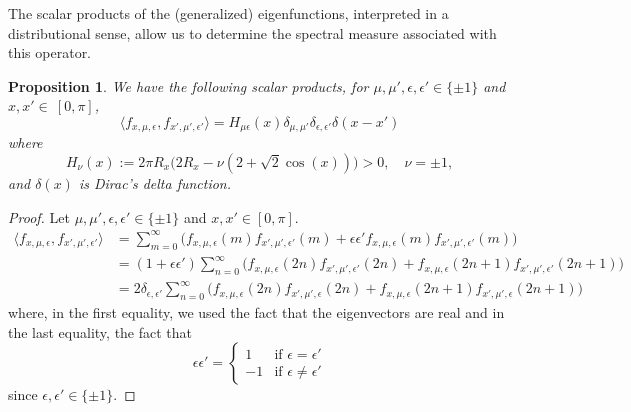 \documentclass[11pt]{amsart}
\theoremstyle{definition}
\theoremstyle{remark}
\theoremstyle{plain}
\newtheorem{proposition}{Proposition}
\numberwithin{equation}{section}
\numberwithin{lemma}{section}
\numberwithin{definition}{section}
\numberwithin{proposition}{section}
\numberwithin{corollary}{section}
\numberwithin{theorem}{section}
\numberwithin{remark}{section}
\begin{document}
The scalar products of the (generalized) eigenfunctions, interpreted in a distributional sense, allow us to determine the spectral measure associated with this operator.
\begin{proposition}\label{scalar_products1}
We have the following scalar products, for $\mu,\mu',\epsilon, \epsilon' \in \{\pm 1\}$ and $x,x'\in~[0,\pi]$,
 $$
 \langle f_{x,\mu,\epsilon},  f_{x',\mu',\epsilon'} \rangle=H_{\mu\epsilon}(x)\delta_{\mu,\mu'}\delta_{\epsilon,\epsilon'}\delta(x-x')
$$
where 
\begin{equation}\label{H_eps}
 H_{\nu}(x):=2\pi R_x\big(2R_x-\nu(2+\sqrt{2}\cos(x))\big)>0, \quad \nu=\pm1,
\end{equation}
and $\delta(x)$ is Dirac's delta function.
\end{proposition}
\begin{proof}
 
Let $\mu,\mu',\epsilon, \epsilon' \in \{\pm 1\}$ and $x,x' \in [0,\pi]$.
\begin{align*}
 \langle f_{x,\mu,\epsilon}, f_{x',\mu',\epsilon'} \rangle 
& = \sum_{m=0}^\infty \Big( f_{x,\mu,\epsilon}(m) f_{x',\mu',\epsilon'}(m) + \epsilon\epsilon' f_{x,\mu,\epsilon}(m) f_{x',\mu',\epsilon'}(m) \Big) \\
& = (1+\epsilon\epsilon') \sum_{n=0}^\infty \Big(f_{x,\mu,\epsilon}(2n) f_{x',\mu',\epsilon'}(2n) + f_{x,\mu,\epsilon}(2n+1) f_{x',\mu',\epsilon'}(2n+1)\Big) \\
& = 2\delta_{\epsilon,\epsilon'} \sum_{n=0}^\infty \Big( f_{x,\mu,\epsilon}(2n) f_{x',\mu',\epsilon}(2n) + f_{x,\mu,\epsilon}(2n+1) f_{x',\mu',\epsilon}(2n+1)\Big)
 \end{align*}
 where, in the first equality, we used the fact that the eigenvectors are real and in the last equality, the fact that 
 $$
 \epsilon\epsilon'=
\begin{cases}
 1 & \text{if } \epsilon=\epsilon' \\
 -1 & \text{if } \epsilon\neq\epsilon'
\end{cases}
$$
since $\epsilon,\epsilon'\in\{\pm1\}$.


\end{proof}
\end{document}
